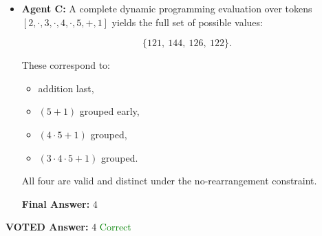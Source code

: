 \begin{tcolorbox}
\begin{itemize}[leftmargin=1.5em, nosep]
\medskip
\noindent\textbf{Final Answer:} $\boxed{2}$
        \item \textbf{Agent C:} A complete dynamic programming evaluation over tokens $[2,\cdot,3,\cdot,4,\cdot,5,+,1]$ yields the full set of possible values:

\[
\{121,\ 144,\ 126,\ 122\}.
\]

These correspond to:
\begin{itemize}[left=0pt,topsep=2pt,itemsep=0pt]
    \item addition last,
    \item $(5+1)$ grouped early,
    \item $(4\cdot5 + 1)$ grouped,
    \item $(3\cdot4\cdot5 + 1)$ grouped.
\end{itemize}

All four are valid and distinct under the no-rearrangement constraint.

\medskip
\noindent\textbf{Final Answer:} $\boxed{4}$
    \end{itemize}

    \vspace{0.1cm}
    \textbf{VOTED Answer:} $\boxed{4}$ \textcolor{green}{Correct}

\end{tcolorbox}

\label{fig:case_study_math}
